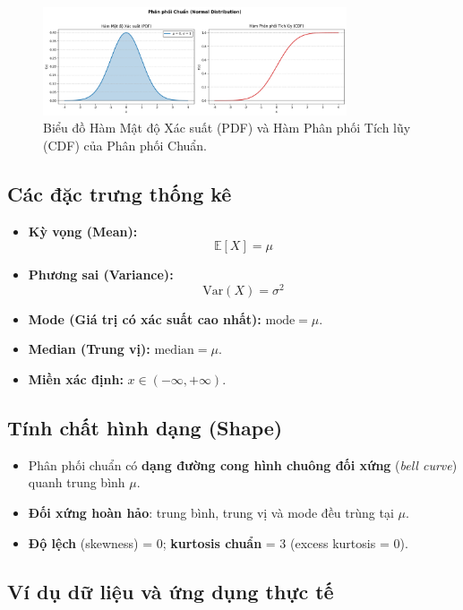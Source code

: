 \begin{figure}[h!]
    \centering
    \includegraphics[width=0.8\textwidth]{images/Normal_PDF_and_CDF.png}
    \caption{Biểu đồ Hàm Mật độ Xác suất (PDF) và Hàm Phân phối Tích lũy (CDF) của Phân phối Chuẩn.}
    \label{fig:normal_dist}
\end{figure}

\subsection{Các đặc trưng thống kê}
\begin{itemize}
    \item \textbf{Kỳ vọng (Mean):} 
    \[
    \mathbb{E}[X] = \mu
    \]
    \item \textbf{Phương sai (Variance):} 
    \[
    \mathrm{Var}(X) = \sigma^2
    \]
    \item \textbf{Mode (Giá trị có xác suất cao nhất):} $\mathrm{mode} = \mu$.
    \item \textbf{Median (Trung vị):} $\mathrm{median} = \mu$.
    \item \textbf{Miền xác định:} $x \in (-\infty, +\infty)$.
\end{itemize}

\subsection{Tính chất hình dạng (Shape)}

\begin{itemize}
    \item Phân phối chuẩn có \textbf{dạng đường cong hình chuông đối xứng} (\textit{bell curve}) quanh trung bình $\mu$.
    \item \textbf{Đối xứng hoàn hảo}: trung bình, trung vị và mode đều trùng tại $\mu$.
    \item \textbf{Độ lệch} (skewness) = 0; \textbf{kurtosis chuẩn} = 3 (excess kurtosis = 0).
\end{itemize}

\subsection{Ví dụ dữ liệu và ứng dụng thực tế }

